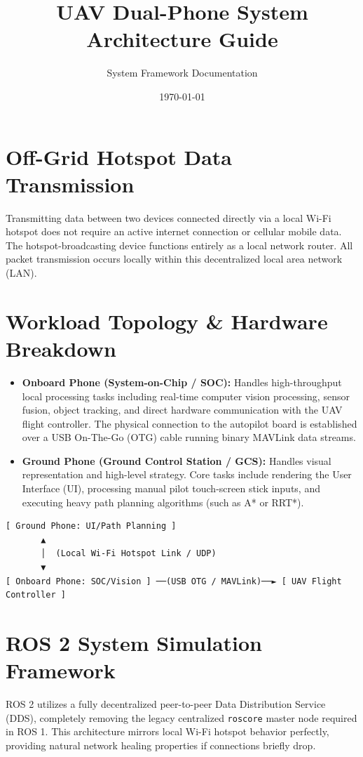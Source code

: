 \documentclass[11pt,a4paper]{article}
\title{UAV Dual-Phone System Architecture Guide}
\author{System Framework Documentation}
\date{\today}
\begin{document}
\maketitle

\section{Off-Grid Hotspot Data Transmission}
Transmitting data between two devices connected directly via a local Wi-Fi hotspot does not require an active internet connection or cellular mobile data. The hotspot-broadcasting device functions entirely as a local network router. All packet transmission occurs locally within this decentralized local area network (LAN).

\section{Workload Topology \& Hardware Breakdown}
\begin{itemize}
    \item \textbf{Onboard Phone (System-on-Chip / SOC):} Handles high-throughput local processing tasks including real-time computer vision processing, sensor fusion, object tracking, and direct hardware communication with the UAV flight controller. The physical connection to the autopilot board is established over a USB On-The-Go (OTG) cable running binary MAVLink data streams.
    \item \textbf{Ground Phone (Ground Control Station / GCS):} Handles visual representation and high-level strategy. Core tasks include rendering the User Interface (UI), processing manual pilot touch-screen stick inputs, and executing heavy path planning algorithms (such as A* or RRT*).
\end{itemize}

\begin{verbatim}
[ Ground Phone: UI/Path Planning ] 
       ▲
       │  (Local Wi-Fi Hotspot Link / UDP)
       ▼
[ Onboard Phone: SOC/Vision ] ──(USB OTG / MAVLink)──► [ UAV Flight Controller ]
\end{verbatim}

\section{ROS 2 System Simulation Framework}
ROS 2 utilizes a fully decentralized peer-to-peer Data Distribution Service (DDS), completely removing the legacy centralized \texttt{roscore} master node required in ROS 1. This architecture mirrors local Wi-Fi hotspot behavior perfectly, providing natural network healing properties if connections briefly drop.
\end{document}

